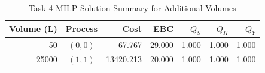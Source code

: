 \begin{table}[H]
\renewcommand{\arraystretch}{1.15}
\caption{Task 4 MILP Solution Summary for Additional Volumes}
\label{tab:task34-solution-summary}
\centering
\small
\begin{tabular}{@{}rcrrrrr@{}}
\toprule
Volume (L) & Process & Cost & EBC & $Q_S$ & $Q_H$ & $Q_Y$ \\
\midrule
50 & $(0,0)$ & 67.767 & 29.000 & 1.000 & 1.000 & 1.000 \\
25000 & $(1,1)$ & 13420.213 & 20.000 & 1.000 & 1.000 & 1.000 \\
\bottomrule
\end{tabular}
\end{table}
